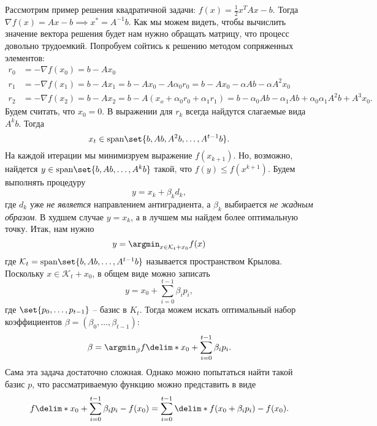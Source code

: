 Рассмотрим пример решения квадратичной задачи: $f(x) = \frac{1}{2}x^T A x - b$. Тогда $\nabla f(x) = Ax - b \implies x^* = A^{-1} b$. Как мы можем видеть, чтобы вычислить значение вектора решения будет нам нужно обращать матрицу, что процесс довольно трудоемкий. Попробуем сойтись к решению методом сопряженных элементов:
\begin{align*}
    r_0 &= -\nabla f(x_0) = b - Ax_0\\
    r_1 &= -\nabla f(x_1) = b - Ax_1 = b - Ax_0 - A\alpha_0 r_0 = b - Ax_0 - \alpha Ab - \alpha A^2x_0\\
    r_2 &= -\nabla f(x_2) = b - Ax_2 = b - A(x_o + \alpha_0r_0 + \alpha_1r_1) = b - \alpha_0 Ab - \alpha_1 Ab + \alpha_0\alpha_1 A^2b + A^3x_0.
\end{align*}
Будем считать, что $x_0 = 0$. В выражении для $r_k$ всегда найдутся слагаемые вида $A^kb$. Тогда
\begin{equation*}
    x_t \in \mathrm{span}\set{b, Ab, A^2b, \ldots, A^{t - 1}b}.
\end{equation*}
На каждой итерации мы минимизруем выражение $f(x_{k + 1})$. Но, возможно, найдется $y \in \mathrm{span}\set{b, Ab, \ldots, A^kb}$ такой, что $f(y) \leq f(x^{k + 1})$. Будем выполнять процедуру
\begin{equation*}
    y = x_k + \beta_k d_k,
\end{equation*}
где $d_k$ уже \textit{не является} направлением антиградиента, а $\beta_k$ выбирается \textit{не жадным образом}. В худшем случае $y = x_k$, а в лучшем мы найдем более оптимальную точку. Итак, нам нужно
\begin{equation*}
    y = \argmin_{x \in \mathcal{K}_t + x_0} f(x)
\end{equation*}
где $\mathcal{K}_t = \mathrm{span}\set{b, Ab, \ldots, A^{t - 1}b}$ называется пространством Крылова. Поскольку $x \in \mathcal{K}_t + x_0$, в общем виде можно записать
\begin{equation*}
    y = x_0 + \sum_{i = 0}^{t - 1} \beta_i p_i,
\end{equation*}
где $\set{p_0, \ldots, p_{t - 1}}$ -- базис в $K_t$. Тогда можем искать оптимальный набор коэффициентов $\beta = (\beta_0, \ldots, \beta_{t - 1})$:
\begin{equation*}
    \beta = \argmin_{\beta} f\delim*{x_0 + \sum_{i = 0}^{t - 1} \beta_ip_i}.
\end{equation*}
Сама эта задача достаточно сложная. Однако можно попытаться найти такой базис $p$, что рассматриваемую функцию можно представить в виде
\begin{equation*}
    f\delim*{x_0 + \sum_{i = 0}^{t - 1} \beta_ip_i} - f(x_0) = \sum_{i = 0}^{t - 1} \delim*{f(x_0 + \beta_ip_i) - f(x_0)}.
\end{equation*}
